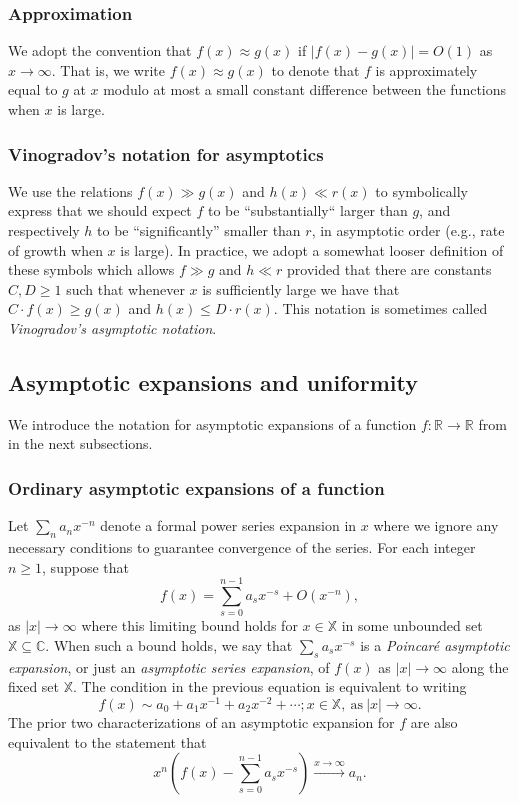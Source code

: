 \documentclass[11pt,reqno,a4letter]{article}
\numberwithin{figure}{section}
\numberwithin{table}{section}
\theoremstyle{plain}
\numberwithin{theorem}{section}
\theoremstyle{definition}
\begin{document}
\subsubsection{Approximation} 
     
We adopt the convention that $f(x) \approx g(x)$ if $|f(x) - g(x)| = O(1)$ as 
$x \rightarrow \infty$. 
That is, we write $f(x) \approx g(x)$ to denote that $f$ is approximately equal to $g$ at $x$ modulo at most a
small constant difference between the functions when $x$ is large. 

\subsubsection{Vinogradov's notation for asymptotics} 

We use the relations $f(x) \gg g(x)$ and $h(x) \ll r(x)$ to symbolically express that we should expect 
$f$ to be ``substantially`` larger than $g$, and respectively $h$ 
to be ``significantly'' smaller than $r$, in asymptotic order 
(e.g., rate of growth when $x$ is large). In practice, we adopt a somewhat looser definition of these symbols which 
allows $f \gg g$ and $h \ll r$ provided that there are constants $C, D \geq 1$ such that whenever $x$ is sufficiently 
large we have that $C \cdot f(x) \geq g(x)$ and $h(x) \leq D \cdot r(x)$. This notation is sometimes called 
\emph{Vinogradov's asymptotic notation}. 

\subsection{Asymptotic expansions and uniformity} 

We introduce the notation for asymptotic expansions of a function $f: \mathbb{R} \rightarrow \mathbb{R}$ from 
\cite[\S 2.1(iii)]{NISTHB} in the next subsections. 

\subsubsection{Ordinary asymptotic expansions of a function} 

Let $\sum_{n} a_n x^{-n}$ denote a formal power series expansion in $x$ where we 
ignore any necessary conditions to guarantee convergence of the series. 
For each integer $n \geq 1$, suppose that 
\[
f(x) = \sum_{s=0}^{n-1} a_s x^{-s} + O(x^{-n}), 
\]
as $|x| \rightarrow \infty$ where this limiting bound holds for $x \in \mathbb{X}$ in some unbounded set 
$\mathbb{X} \subseteq \mathbb{C}$. 
When such a bound holds, we say that $\sum_s a_s x^{-s}$ is a \emph{Poincar\'{e} asymptotic expansion}, 
or just an \emph{asymptotic series expansion}, of $f(x)$ as 
$|x| \rightarrow \infty$ along the fixed set $\mathbb{X}$. 
The condition in the previous equation is equivalent to writing 
\[
f(x) \sim a_0 + a_1 x^{-1} + a_2 x^{-2} + \cdots; x \in \mathbb{X}, \mathrm{\ as \ } |x| \rightarrow \infty. 
\]
The prior two characterizations of an asymptotic expansion for $f$ are also equivalent to the 
statement that 
\[
x^n \left(f(x) - \sum_{s=0}^{n-1} a_s x^{-s}\right) \xrightarrow{x \rightarrow \infty} a_n. 
\] 
\end{document}
